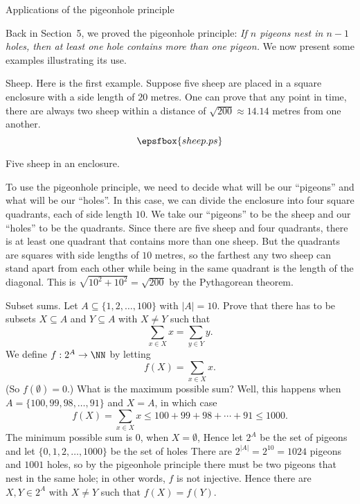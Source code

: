 \advsect Applications of the pigeonhole principle

Back in Section~5, we proved the pigeonhole principle: {\sl If $n$ pigeons nest in $n-1$ holes,
then at least one hole contains more than one pigeon.} We now present some examples illustrating
its use.

\medskip\boldlabel Sheep.
Here is the first example. Suppose five sheep are placed in a square enclosure with a side
length of $20$ metres. One can prove that any point in time, there are always two sheep within
a distance of $\sqrt{200}\approx 14.14$ metres from one another.
\midinsert
$$\epsfbox{sheep.ps}$$
\vskip5pt
\caption{Five sheep in an enclosure.}
\endinsert
\goodbreak
To use the pigeonhole principle, we need to decide what will be our ``pigeons'' and what will
be our ``holes''. In this case, we can divide the enclosure into four square quadrants,
each of side length $10$. We take our ``pigeons'' to be the sheep and our ``holes''
to be the quadrants. Since there are five sheep and four quadrants, there is at least one quadrant
that contains more than one sheep. But the quadrants are squares with side lengths of $10$ metres,
so the farthest any two sheep can stand apart from each other while being in the same quadrant
is the length of the diagonal. This is $\sqrt{10^2 + 10^2} = \sqrt{200}$ by the Pythagorean
theorem.

\medskip\boldlabel Subset sums.
Let $A\subseteq \{1,2,\ldots, 100\}$ with $|A|=10$. Prove
that there has to be subsets $X\subseteq A$ and $Y\subseteq A$ with $X\ne Y$ such that
$$\sum_{x\in X} x = \sum_{y\in Y} y.$$
We define $f:2^A\to \NN$ by letting
$$f(X) = \sum_{x\in X} x.$$
(So $f(\emptyset) = 0$.) What is the maximum possible sum? Well, this happens when
$A = \{100,99, 98,\ldots, 91\}$ and $X = A$, in which case
$$f(X) = \sum_{x\in X} x \le 100 + 99 + 98 + \cdots + 91 \le 1000.$$
The minimum possible sum is $0$, when $X = \emptyset$,
Hence let $2^A$ be the set of pigeons and let $\{0,1,2,\ldots,1000\}$ be the set of holes
There are $2^{|A|} = 2^{10} = 1024$ pigeons and $1001$ holes, so by the pigeonhole principle
there must be two pigeons that nest in the same hole; in other words, $f$ is not injective.
Hence there are $X,Y\in 2^A$ with $X\ne Y$ such that $f(X) = f(Y)$.

